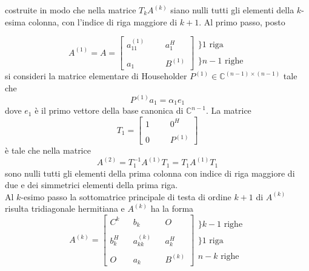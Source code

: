 costruite in modo che nella matrice $T_k A^{(k)}$ siano nulli tutti gli
elementi della $k$-esima colonna, con l'indice di riga maggiore di $k + 1$.
Al primo passo, posto

$$
A^{(1)} = A =
\left[
\begin{array}{llll}
a_{11}^{(1)} &  &              & a_1^{H}           \\
             &  &              &                   \\
a_1          &  &              & B^{(1)}
\end{array}
\right]
\begin{array}{l}
\} 1 \text{ riga}                                  \\
                                                   \\
\} n-1 \text{ righe}
\end{array}
$$
si consideri la matrice elementare di Householder $P^{(1)} \in
 \mathbb{C}^{(n-1) \times (n-1)}$ tale che
$$ P^{(1)}a_1 = \alpha_1 e_1$$
dove $e_1$ \`e il primo vettore della base canonica di $\mathbb{C}^{n-1}$.
 La matrice
$$
T_1 =
\left[
\begin{array}{llll}
  1          &  &              & 0^{H}             \\
             &  &              &                   \\
  0          &  &              & P^{(1)}
\end{array}
\right]
$$
\`e tale che nella matrice
$$
A^{(2)} = T_1^{-1}A^{(1)}T_1 = T_1 A^{(1)} T_1
$$
sono nulli tutti gli elementi della prima colonna con indice di riga maggiore
di due e dei simmetrici elementi della prima riga. \\
Al $k$-esimo passo la sottomatrice principale di testa di ordine $k + 1$ di
$A^{(k)}$ risulta tridiagonale hermitiana e $A^{(k)}$ ha la forma
$$
A^{(k)} =
\left[
\begin{array}{ccccc}
  C^{k}      &  & b_k          &  & O              \\
             &  &              &  &                \\
  b_k^{H}    &  & a_{kk}^{(k)} &  & a_k^{H}        \\
             &  &              &  &                \\
  O          &  & a_k          &  & B^{(k)}
\end{array}
\right]
\begin{array}{l}
\} k-1 \text{ righe}                               \\
                                                   \\
\} 1 \text{ riga}                                  \\
                                                   \\
n-k \text{ righe}
\end{array}
$$
